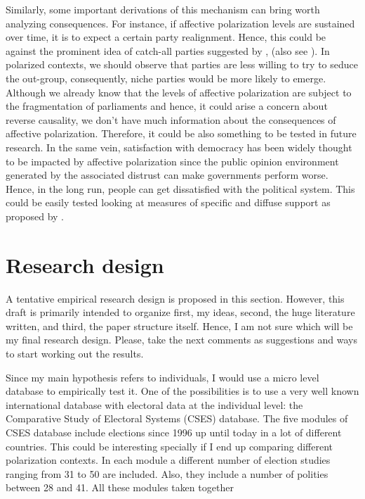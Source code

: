 \documentclass[a4paper, svgnames]{article}
\begin{document}
Similarly, some important derivations of this mechanism can bring worth analyzing consequences. For instance, if affective polarization levels are sustained over time, it is to expect a certain party realignment. Hence, this could be against the prominent idea of catch-all parties suggested by \cite{Kirchheimer1966}, (also see \cite{Krouwel2003}). In polarized contexts, we should observe that parties are less willing to try to seduce the out-group, consequently, niche parties would be more likely to emerge. Although we already know that the levels of affective polarization are subject to the fragmentation of parliaments \citep{Orriols2020} and hence, it could arise a concern about reverse causality, we don't have much information about the consequences of affective polarization. Therefore, it could be also something to be tested in future research. In the same vein, satisfaction with democracy has been widely thought to be impacted by affective polarization since the public opinion environment generated by the associated distrust can make governments perform worse. Hence, in the long run, people can get dissatisfied with the political system. This could be easily tested looking at measures of specific and diffuse support as proposed by \cite{Easton1975}.



\section{Research design}

A tentative empirical research design is proposed in this section. However, this draft is primarily intended to organize first, my ideas, second, the huge literature written, and third, the paper structure itself. Hence, I am not sure which will be my final research design. Please, take the next comments as suggestions and ways to start working out the results.

Since my main hypothesis refers to individuals, I would use a micro level database to empirically test it. One of the possibilities is to use a very well known international database with electoral data at the individual level: the Comparative Study of Electoral Systems (CSES) database. The five modules of CSES database include elections since 1996 up until today in a lot of different countries. This could be interesting specially if I end up comparing different polarization contexts. In each module a different number of election studies ranging from 31 to 50 are included. Also, they include a number of polities between 28 and 41. All these modules taken together
\end{document}

